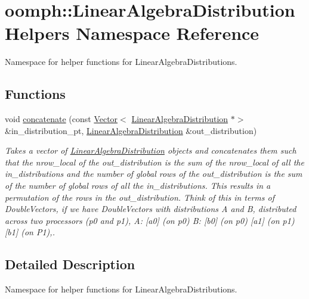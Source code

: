 \hypertarget{namespaceoomph_1_1LinearAlgebraDistributionHelpers}{}\section{oomph\+:\+:Linear\+Algebra\+Distribution\+Helpers Namespace Reference}
\label{namespaceoomph_1_1LinearAlgebraDistributionHelpers}


Namespace for helper functions for Linear\+Algebra\+Distributions.  


\subsection*{Functions}
\begin{DoxyCompactItemize}
\item 
void \hyperlink{namespaceoomph_1_1LinearAlgebraDistributionHelpers_ad3ba423fba64e7db91e9155efa7df5d0}{concatenate} (const \hyperlink{classoomph_1_1Vector}{Vector}$<$ \hyperlink{classoomph_1_1LinearAlgebraDistribution}{Linear\+Algebra\+Distribution} $\ast$$>$ \&in\+\_\+distribution\+\_\+pt, \hyperlink{classoomph_1_1LinearAlgebraDistribution}{Linear\+Algebra\+Distribution} \&out\+\_\+distribution)
\begin{DoxyCompactList}\small\item\em Takes a vector of \hyperlink{classoomph_1_1LinearAlgebraDistribution}{Linear\+Algebra\+Distribution} objects and concatenates them such that the nrow\+\_\+local of the out\+\_\+distribution is the sum of the nrow\+\_\+local of all the in\+\_\+distributions and the number of global rows of the out\+\_\+distribution is the sum of the number of global rows of all the in\+\_\+distributions. This results in a permutation of the rows in the out\+\_\+distribution. Think of this in terms of Double\+Vectors, if we have Double\+Vectors with distributions A and B, distributed across two processors (p0 and p1), A\+: \mbox{[}a0\mbox{]} (on p0) B\+: \mbox{[}b0\mbox{]} (on p0) \mbox{[}a1\mbox{]} (on p1) \mbox{[}b1\mbox{]} (on P1),. \end{DoxyCompactList}\end{DoxyCompactItemize}


\subsection{Detailed Description}
Namespace for helper functions for Linear\+Algebra\+Distributions. 

